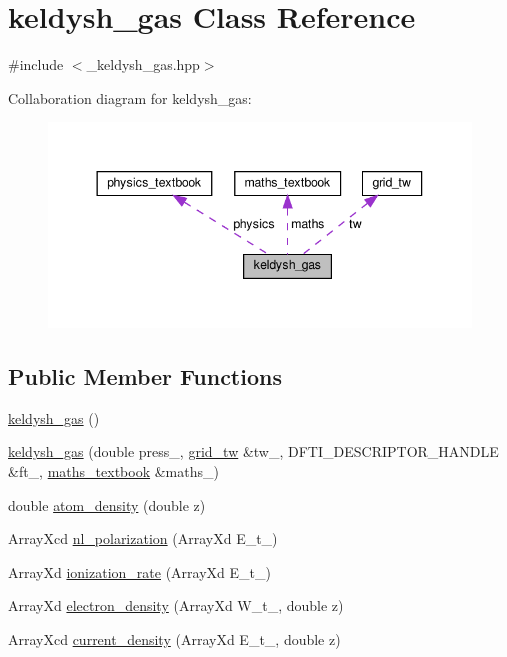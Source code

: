 \hypertarget{classkeldysh__gas}{}\section{keldysh\+\_\+gas Class Reference}
\label{classkeldysh__gas}


{\ttfamily \#include $<$\+\_\+keldysh\+\_\+gas.\+hpp$>$}



Collaboration diagram for keldysh\+\_\+gas\+:\nopagebreak
\begin{figure}[H]
\begin{center}
\leavevmode
\includegraphics[width=344pt]{classkeldysh__gas__coll__graph}
\end{center}
\end{figure}
\subsection*{Public Member Functions}
\begin{DoxyCompactItemize}
\item 
\hyperlink{classkeldysh__gas_a25e559700c04e93efb560db511adbe72}{keldysh\+\_\+gas} ()
\item 
\hyperlink{classkeldysh__gas_a8175a1520a2a7cd90b81d9af3ac64c91}{keldysh\+\_\+gas} (double press\+\_\+, \hyperlink{classgrid__tw}{grid\+\_\+tw} \&tw\+\_\+, D\+F\+T\+I\+\_\+\+D\+E\+S\+C\+R\+I\+P\+T\+O\+R\+\_\+\+H\+A\+N\+D\+LE \&ft\+\_\+, \hyperlink{classmaths__textbook}{maths\+\_\+textbook} \&maths\+\_\+)
\item 
double \hyperlink{classkeldysh__gas_acfa0604a6f00bce28b72b9a07fb79314}{atom\+\_\+density} (double z)
\item 
Array\+Xcd \hyperlink{classkeldysh__gas_a1cd65d1983cb6c5ff9d04eeb29e94dd5}{nl\+\_\+polarization} (Array\+Xd E\+\_\+t\+\_\+)
\item 
Array\+Xd \hyperlink{classkeldysh__gas_a42dc79816adcae9c25499baa7256ec10}{ionization\+\_\+rate} (Array\+Xd E\+\_\+t\+\_\+)
\item 
Array\+Xd \hyperlink{classkeldysh__gas_a8dddacdfabea4d6c3049088cc868715a}{electron\+\_\+density} (Array\+Xd W\+\_\+t\+\_\+, double z)
\item 
Array\+Xcd \hyperlink{classkeldysh__gas_a7d5f16951d622544d814518a37768411}{current\+\_\+density} (Array\+Xd E\+\_\+t\+\_\+, double z)
\end{DoxyCompactItemize}
